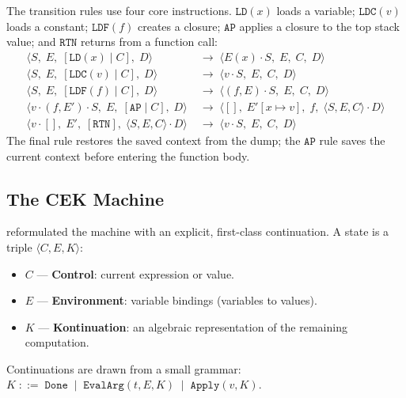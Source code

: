\documentclass[11pt, a4paper]{article}
\theoremstyle{definition}
\theoremstyle{plain}
\theoremstyle{remark}
\begin{document}
The transition rules use four core instructions.  $\mathtt{LD}(x)$ loads
a variable; $\mathtt{LDC}(v)$ loads a constant; $\mathtt{LDF}(f)$ creates
a closure; $\mathtt{AP}$ applies a closure to the top stack value; and
$\mathtt{RTN}$ returns from a function call:
\begin{align*}
  \langle S,\; E,\; [\mathtt{LD}(x)\mid C],\; D \rangle
    &\;\to\; \langle E(x)\cdot S,\; E,\; C,\; D \rangle \\
  \langle S,\; E,\; [\mathtt{LDC}(v)\mid C],\; D \rangle
    &\;\to\; \langle v\cdot S,\; E,\; C,\; D \rangle \\
  \langle S,\; E,\; [\mathtt{LDF}(f)\mid C],\; D \rangle
    &\;\to\; \langle (f,E)\cdot S,\; E,\; C,\; D \rangle \\
  \langle v\cdot(f,E')\cdot S,\; E,\; [\mathtt{AP}\mid C],\; D \rangle
    &\;\to\; \langle [],\; E'[x\mapsto v],\; f,\;
              \langle S,E,C\rangle\cdot D \rangle \\
  \langle v\cdot[],\; E',\; [\mathtt{RTN}],\; \langle S,E,C\rangle\cdot D \rangle
    &\;\to\; \langle v\cdot S,\; E,\; C,\; D \rangle
\end{align*}
The final rule restores the saved context from the dump; the $\mathtt{AP}$
rule saves the current context before entering the function body.

\subsection{The CEK Machine}

\citet{felleisen1986} reformulated the machine with an explicit,
first-class continuation.  A state is a triple $\langle C, E, K \rangle$:
\begin{itemize}
  \item $C$ --- \textbf{Control}: current expression or value.
  \item $E$ --- \textbf{Environment}: variable bindings (variables to values).
  \item $K$ --- \textbf{Kontinuation}: an algebraic representation of the
        remaining computation.
\end{itemize}

Continuations are drawn from a small grammar:
$K \;::=\; \mathtt{Done} \;\mid\; \mathtt{EvalArg}(t, E, K) \;\mid\; \mathtt{Apply}(v, K)$.
\end{document}
